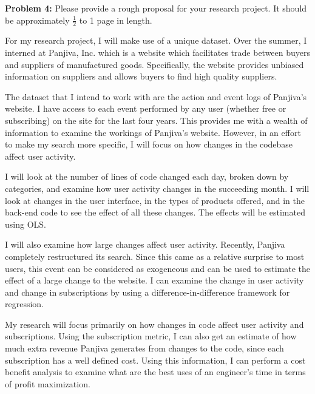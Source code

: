 \documentclass[psamsfonts]{amsart}
\newenvironment{sol}{\vspace{0.25cm}{\large \bfseries Solution:}}{\qedsymbol}
\newenvironment{prob}[1]{\begin{framed}{\large \bfseries Problem #1:}}{\end{framed}}
\begin{document}
\begin{prob}{4}
Please provide a rough proposal for your research project.  It should be approximately $\frac{1}{2}$ to 1 page in length. 
\end{prob}
\begin{sol}
For my research project, I will make use of a unique dataset. Over the summer, I interned at Panjiva, Inc. which is a website which facilitates trade between buyers and suppliers of manufactured goods. Specifically, the website provides unbiased information on suppliers and allows buyers to find high quality suppliers. 

The dataset that I intend to work with are the action and event logs of Panjiva's website. I have access to each event performed by any user (whether free or subscribing) on the site for the last four years. This provides me with a wealth of information to examine the workings of Panjiva's website. However, in an effort to make my search more specific, I will focus on how changes in the codebase affect user activity.

I will look at the number of lines of code changed each day, broken down by categories, and examine how user activity changes in the succeeding month. I will look at changes in the user interface, in the types of products offered, and in the back-end code to see the effect of all these changes. The effects will be estimated using OLS.

I will also examine how large changes affect user activity. Recently, Panjiva completely restructured its search. Since this came as a relative surprise to most users, this event can be considered as exogeneous and can be used to estimate the effect of a large change to the website. I can examine the change in user activity and change in subscriptions by using a difference-in-difference framework for regression.

My research will focus primarily on how changes in code affect user activity and subscriptions. Using the subscription metric, I can also get an estimate of how much extra revenue Panjiva generates from changes to the code, since each subscription has a well defined cost. Using this information, I can perform a cost benefit analysis to examine what are the best uses of an engineer's time in terms of profit maximization.
\end{sol}
\end{document}
